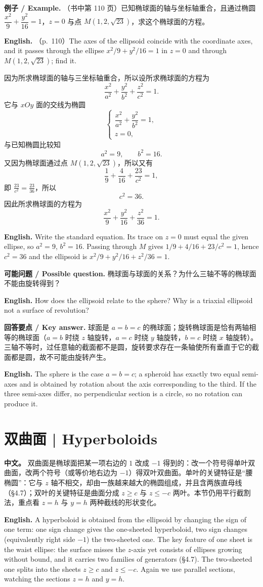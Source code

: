 \documentclass[UTF8,11pt,a4paper]{ctexart}
\newcommand{\APS}[2]{\par\noindent\textbf{中文。} #1\par\noindent\textbf{English.} #2\par\smallskip}
\newcommand{\EN}[1]{\par\noindent \textbf{English.} #1\par}
\newcommand{\EX}[2]{\par\noindent \textbf{例子 / Example.} #1\par\EN{#2}}
\newcommand{\ASK}[4]{\par\noindent \textbf{可能问题 / Possible question.} #1\par\EN{#2}\noindent \textbf{回答要点 / Key answer.} #3\par\EN{#4}\medskip}
\theoremstyle{definition}
\begin{document}
\EX{（书中第 110 页）已知椭球面的轴与坐标轴重合，且通过椭圆 $\dfrac{x^2}{9}+\dfrac{y^2}{16}=1$，$z=0$ 与点 $M(1,2,\sqrt{23})$，求这个椭球面的方程。}{（p.~110）The axes of the ellipsoid coincide with the coordinate axes, and it passes through the ellipse $x^2/9+y^2/16=1$ in $z=0$ and through $M(1,2,\sqrt{23})$; find it.}
因为所求椭球面的轴与三坐标轴重合，所以设所求椭球面的方程为
\[
\frac{x^2}{a^2}+\frac{y^2}{b^2}+\frac{z^2}{c^2}=1.
\]
它与 $xOy$ 面的交线为椭圆
\[
\begin{cases}\dfrac{x^2}{a^2}+\dfrac{y^2}{b^2}=1,\\ z=0,\end{cases}
\]
与已知椭圆比较知
\[
a^2=9,\qquad b^2=16.
\]
又因为椭球面通过点 $M(1,2,\sqrt{23})$，所以又有
\[
\frac19+\frac{4}{16}+\frac{23}{c^2}=1,
\]
即 $\frac{23}{c^2}=\frac{23}{36}$，所以
\[
c^2=36.
\]
因此所求椭球面的方程为
\[
\frac{x^2}{9}+\frac{y^2}{16}+\frac{z^2}{36}=1.
\]
\EN{Write the standard equation. Its trace on $z=0$ must equal the given ellipse, so $a^2=9$, $b^2=16$. Passing through $M$ gives $1/9+4/16+23/c^2=1$, hence $c^2=36$ and the ellipsoid is $x^2/9+y^2/16+z^2/36=1$.}

\ASK{椭球面与球面的关系？为什么三轴不等的椭球面不能由旋转得到？}{How does the ellipsoid relate to the sphere? Why is a triaxial ellipsoid not a surface of revolution?}{球面是 $a=b=c$ 的椭球面；旋转椭球面是恰有两轴相等的椭球面（$a=b$ 时绕 $z$ 轴旋转，$a=c$ 时绕 $y$ 轴旋转，$b=c$ 时绕 $x$ 轴旋转）。三轴不等时，过任意轴的截面都不是圆，旋转要求存在一条轴使所有垂直于它的截面都是圆，故不可能由旋转产生。}{The sphere is the case $a=b=c$; a spheroid has exactly two equal semi-axes and is obtained by rotation about the axis corresponding to the third. If the three semi-axes differ, no perpendicular section is a circle, so no rotation can produce it.}

\section{\label{sec:5}双曲面 | Hyperboloids}
\APS{双曲面是椭球面把某一项右边的 $1$ 改成 $-1$ 得到的：改一个符号得单叶双曲面，改两个符号（或等价地右边为 $-1$）得双叶双曲面。单叶的关键特征是``腰椭圆''：它与 $z$ 轴不相交，却由一族越来越大的椭圆组成，并且含两族直母线（§4.7）；双叶的关键特征是曲面分成 $z\ge c$ 与 $z\le -c$ 两叶。本节仍用平行截割法，重点看 $z=h$ 与 $y=h$ 两种截线的形状变化。}{A hyperboloid is obtained from the ellipsoid by changing the sign of one term: one sign change gives the one-sheeted hyperboloid, two sign changes (equivalently right side $-1$) the two-sheeted one. The key feature of one sheet is the waist ellipse: the surface misses the $z$-axis yet consists of ellipses growing without bound, and it carries two families of generators (§4.7). The two-sheeted one splits into the sheets $z\ge c$ and $z\le -c$. Again we use parallel sections, watching the sections $z=h$ and $y=h$.}
\end{document}
